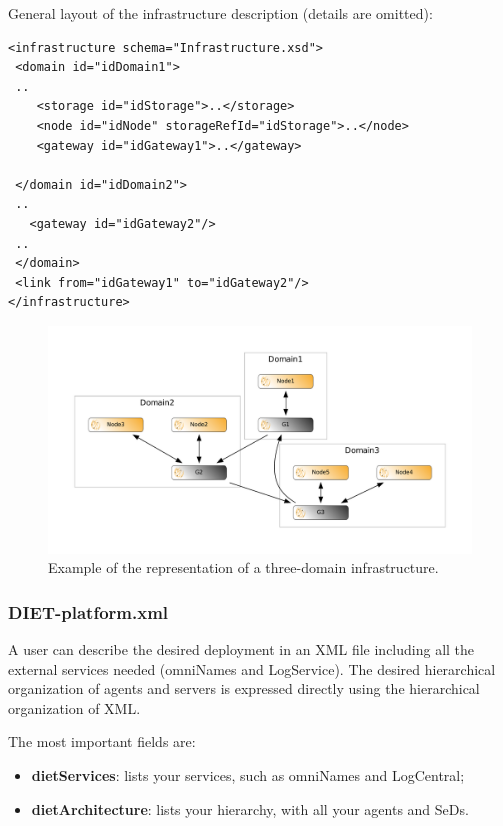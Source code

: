 \vspace{1cm}

General layout of the infrastructure description (details are omitted):
\begin{verbatim}
<infrastructure schema="Infrastructure.xsd">
 <domain id="idDomain1">
 ..
    <storage id="idStorage">..</storage>
    <node id="idNode" storageRefId="idStorage">..</node>
    <gateway id="idGateway1">..</gateway>

 </domain id="idDomain2">
 ..
   <gateway id="idGateway2"/>
 ..
 </domain>
 <link from="idGateway1" to="idGateway2"/>
</infrastructure>
\end{verbatim}


\begin{figure}[h]
  \centering
  \includegraphics[width=15cm]{fig/godiet-infrastructure}
  \caption{Example of the representation of a three-domain infrastructure.\label{fig:GODIETInfrastructure}}
\end{figure}

\subsubsection{DIET-platform.xml}
\label{GODIETPlatform}

A \godiet user can describe the desired deployment in an XML file including all the external services needed (\eg omniNames and LogService). The desired hierarchical organization of agents and servers is expressed directly using the hierarchical organization of XML. 


The most important fields are:
\begin{itemize}
\item \textbf{dietServices}: lists your \diet services, such as omniNames and LogCentral;
\item \textbf{dietArchitecture}: lists your \diet hierarchy, with all your agents and SeDs. 
\end{itemize}

